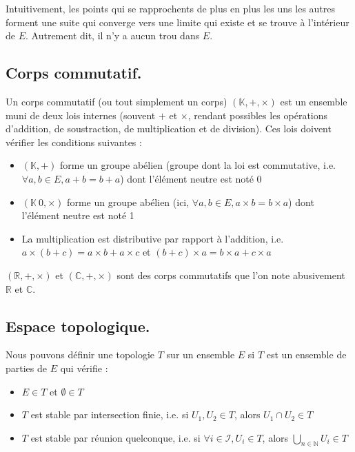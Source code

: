 \noindent Intuitivement, les points qui se rapprochents de plus en plus les uns les autres forment une suite qui converge vers une limite qui existe et se trouve à l'intérieur de $E$. Autrement dit, il n'y a aucun trou dans $E$. \newline 

\subsection{Corps commutatif.} 

\noindent Un corps commutatif (ou tout simplement un corps) $(\mathbb{K}, +, \times)$ est un ensemble muni de deux lois internes (souvent $+$ et $\times$, rendant possibles les opérations d'addition, de soustraction, de multiplication et de division). Ces lois doivent vérifier les conditions suivantes : \newline

\begin{itemize}
    \item $(\mathbb{K}, +)$ forme un groupe abélien (groupe dont la loi est commutative, i.e. $\forall a,b \in E, a + b = b + a$) dont l'élément neutre est noté 0 \newline
    \item $(\mathbb{K} \ {0}, \times)$ forme un groupe abélien (ici, $\forall a,b \in E, a \times b = b \times a$) dont l'élément neutre est noté 1 \newline
    \item La multiplication est distributive par rapport à l'addition, i.e. $a \times (b + c) = a \times b + a \times c$ et $(b + c) \times a = b \times a + c \times a$ \newline
\end{itemize}

\noindent $(\mathbb{R}, +, \times)$ et $(\mathbb{C}, +, \times)$ sont des corps commutatifs que l'on note abusivement $\mathbb{R}$ et $\mathbb{C}$. \newline

\newpage

\subsection{Espace topologique.}

\noindent Nous pouvons définir une topologie $T$ sur un ensemble $E$ si $T$ est un ensemble de parties de $E$ qui vérifie :

\begin{itemize}
    \item $E \in T$ et $\emptyset \in T$ \newline
    \item $T$ est stable par intersection finie, i.e. si $U_1, U_2 \in T$, alors $U_1 \cap U_2 \in T$ \newline
    \item $T$ est stable par réunion quelconque, i.e. si $\forall i \in \mathcal{I}, U_i \in T$, alors $\bigcup_{n \in \mathbb{N}} U_i \in T$ \newline
\end{itemize}

